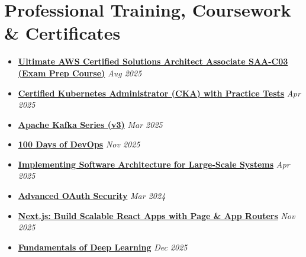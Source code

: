 \section*{Professional Training, Coursework \& Certificates}

\BigDivider
\begin{itemize}[leftmargin=*, itemsep=0.35em]
\item \href{https://www.udemy.com/certificate/UC-b1ef5d20-5c70-472f-a936-96567f299af7/}{\textbf{Ultimate AWS Certified Solutions Architect Associate SAA-C03 (Exam Prep Course)}} \hfill \textit{Aug 2025}
\item \href{https://www.udemy.com/certificate/UC-246987b5-df13-4f9b-a53f-d74d9de0d221/}{\textbf{Certified Kubernetes Administrator (CKA) with Practice Tests}} \hfill \textit{Apr 2025}
\item \href{https://www.udemy.com/certificate/UC-ec3b908f-9983-4510-bdb1-bc1fb5567a2d/}{\textbf{Apache Kafka Series (v3)}} \hfill \textit{Mar 2025}
\item \href{https://engineer.kodekloud.com/certificate-verification/8a2e35fb-02fd-4082-aff3-d1fbc291f0d1}{\textbf{100 Days of DevOps}} \hfill \textit{Nov 2025}
\item \href{https://www.udemy.com/certificate/UC-2a562ca8-a9e3-4ee0-b2c3-e7a432ac4529/}{\textbf{Implementing Software Architecture for Large-Scale Systems}} \hfill \textit{Apr 2025}
\item \href{https://www.udemy.com/certificate/UC-57aa3ba1-44be-4d7d-ab4b-e232f489411d/}{\textbf{Advanced OAuth Security}} \hfill \textit{Mar 2024}
\item \href{https://www.udemy.com/certificate/UC-21804fb9-934e-489c-ae3b-4cbe36235ecd/}{\textbf{Next.js: Build Scalable React Apps with Page \& App Routers}} \hfill \textit{Nov 2025}
\item \href{https://learn.nvidia.com/certificates?id=sBdegKUWTHGek09Ydu52rg}{\textbf{Fundamentals of Deep Learning}} \hfill \textit{Dec 2025}
\end{itemize}

